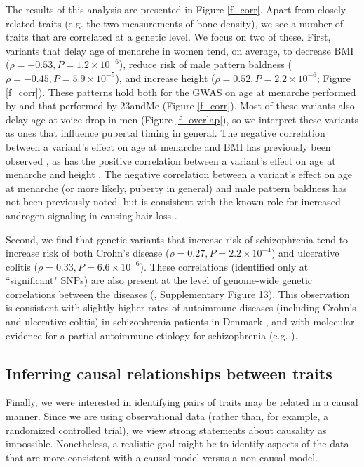 \documentclass[11pt,titlepage]{article}
\begin{document}
The results of this analysis are presented in Figure \ref{f_corr}. 
Apart from closely related traits (e.g. the two measurements of bone density), we see a number of traits that are correlated at a genetic level.
We focus on two of these. 
First, variants that delay age of menarche in women tend, on average, to decrease BMI ($\rho = -0.53, P = 1.2 \times 10^{-6}$), reduce risk of male pattern baldness ($\rho = -0.45, P = 5.9\times 10^{-5}$), and increase height ($\rho = 0.52, P = 2.2 \times 10^{-6}$; Figure \ref{f_corr}).
These patterns hold both for the GWAS on age at menarche performed by \citet{Perry:2014aa} and that performed by 23andMe (Figure \ref{f_corr}).
Most of these variants also delay age at voice drop in men (Figure \ref{f_overlap}), so we interpret these variants as ones that influence pubertal timing in general. 
The negative correlation between a variant's effect on age at menarche and BMI has previously been observed \citep{Elks:2010aa, Perry:2014aa, bulik2015atlas}, as has the positive correlation between a variant's effect on age at menarche and height \citep{Perry:2014aa, bulik2015atlas}.
The negative correlation between a variant's effect on age at menarche (or more likely, puberty in general) and male pattern baldness has not been previously noted, but is consistent with the known role for increased androgen signaling in causing hair loss \citep{Li:2012aa, Richards:2008aa, HAMILTON:1951aa}. 

Second, we find that genetic variants that increase risk of schizophrenia tend to increase risk of both Crohn's disease ($\rho = 0.27, P = 2.2 \times 10^{-4}$) and ulcerative colitis ($\rho = 0.33, P = 6.6 \times 10^{-6}$). These correlations (identified only at ``significant" SNPs) are also present at the level of genome-wide genetic correlations between the diseases (\citet{bulik2015atlas}, Supplementary Figure 13). This observation is consistent with slightly higher rates of autoimmune diseases (including Crohn's and ulcerative colitis) in schizophrenia patients in Denmark \citep{Eaton:2006aa, Eaton:2004aa, Benros:2011aa}, and with molecular evidence for a partial autoimmune etiology for schizophrenia (e.g. \citet{Schizophrenia-Working-Group-of-the-Psychiatric-Genomics-Consortium:2014aa}).

\subsection{Inferring causal relationships between traits}
Finally, we were interested in identifying pairs of traits may be related in a causal manner. 
Since we are using observational data (rather than, for example, a randomized controlled trial), we view strong statements about causality as impossible. 
Nonetheless, a realistic goal might be to identify aspects of the data that are more consistent with a causal model versus a non-causal model.
\end{document}
